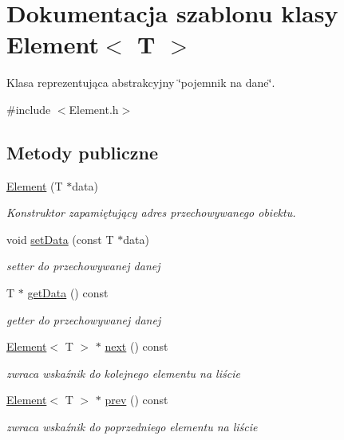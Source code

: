 \hypertarget{class_element}{\section{Dokumentacja szablonu klasy Element$<$ T $>$}
\label{class_element}
}


Klasa reprezentująca abstrakcyjny \char`\"{}pojemnik na dane\char`\"{}.  




{\ttfamily \#include $<$Element.\-h$>$}

\subsection*{Metody publiczne}
\begin{DoxyCompactItemize}
\item 
\hyperlink{class_element_a8d1616b3955f2039f3da1a205155e28f}{Element} (T $\ast$data)
\begin{DoxyCompactList}\small\item\em Konstruktor zapamiętujący adres przechowywanego obiektu. \end{DoxyCompactList}\item 
void \hyperlink{class_element_a60f83f9357c3266559bc6c234b5bf664}{set\-Data} (const T $\ast$data)
\begin{DoxyCompactList}\small\item\em setter do przechowywanej danej \end{DoxyCompactList}\item 
T $\ast$ \hyperlink{class_element_a3ca1fd83364406ea6928590537101d8d}{get\-Data} () const 
\begin{DoxyCompactList}\small\item\em getter do przechowywanej danej \end{DoxyCompactList}\item 
\hyperlink{class_element}{Element}$<$ T $>$ $\ast$ \hyperlink{class_element_ab37531c0ee3bcb3eeeea7f840e3df06a}{next} () const 
\begin{DoxyCompactList}\small\item\em zwraca wskaźnik do kolejnego elementu na liście \end{DoxyCompactList}\item 
\hyperlink{class_element}{Element}$<$ T $>$ $\ast$ \hyperlink{class_element_a3fee6e442312fb97eafb813e973b0001}{prev} () const 
\begin{DoxyCompactList}\small\item\em zwraca wskaźnik do poprzedniego elementu na liście \end{DoxyCompactList}\item 

\end{DoxyCompactItemize}
